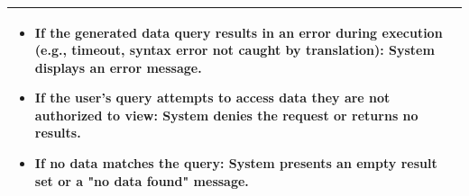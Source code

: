 \begin{minipage}{\textwidth}
\begin{tabularx}{\textwidth}{|p{}|X|}
{\begin{itemize}
            \item If the generated data query results in an error during execution (e.g., timeout, syntax error not caught by translation): System displays an error message.
            \item If the user's query attempts to access data they are not authorized to view: System denies the request or returns no results.
            \item If no data matches the query: System presents an empty result set or a "no data found" message.
        \end{itemize}%
        } \\
    \hline
\end{tabularx}
\end{minipage}
\bigskip
